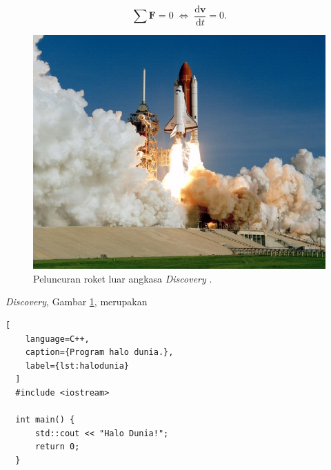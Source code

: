 \begin{equation}
    \label{eq:hukumpertamanewton}
    \sum \mathbf{F} = 0\; \Leftrightarrow\; \frac{\mathrm{d} \mathbf{v} }{\mathrm{d}t} = 0.
\end{equation}


\begin{figure}[ht]
    \centering

    \includegraphics[scale=0.35]{gambar/roketluarangkasa.jpg}

    \caption{Peluncuran roket luar angkasa \emph{Discovery} \citep{roketluarangkasa}.}
    \label{fig:roketluarangkasa}
\end{figure}

\emph{Discovery}, Gambar \ref{fig:roketluarangkasa}, merupakan


\begin{lstlisting}[
    language=C++,
    caption={Program halo dunia.},
    label={lst:halodunia}
  ]
  #include <iostream>
  
  int main() {
      std::cout << "Halo Dunia!";
      return 0;
  }
\end{lstlisting}



